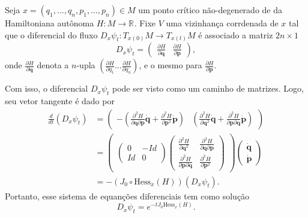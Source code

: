 \documentclass[12pt]{book}
\newcommand{\derivada}[2]{\frac{d #1}{d #2}}
\newcommand{\derivadaparcial}[2]{\frac{\partial #1}{\partial #2}}
\newcommand{\derivadaparcialdois}[2]{\frac{\partial^{2} #1}{\partial #2^{2}}}
\newcommand{\derivadaparcialdoisdois}[3]{\frac{\partial^{2} #1}{\partial #2 \partial#3}}
\newcommand{\espacotangenteponto}[2]{T_{#1}#2}
\newcommand{\estruturacomplexa}{J_{0}}
\newcommand{\hessianaponto}[2]{\text{Hess}_{#1}(#2)}
\newcommand{\real}[1]{\mathbb{R}^{#1}}
\newcommand{\reta}{\real{}}
\begin{document}
	Seja $x=(q_{1}, \dots, q_{n},p_{1}, \dots, p_{n})\in M$ um ponto crítico não-degenerado de da Hamiltoniana autônoma $H:M \to \reta$. Fixe $V$ uma vizinhança corrdenada de $x$ tal que o diferencial do fluxo $D_{x}\psi_{t}:\espacotangenteponto{x(0)}{M} \to \espacotangenteponto{x(t)}{M}$ é associado a matriz $2n\times 1$
	$$
	D_{x}\psi_{t} = 
	\left(
		\begin{array}{cc}
		\derivadaparcial{H}{\textbf{q}} &\derivadaparcial{H}{\textbf{p}}
		\end{array}
	\right),
	$$
	onde $\derivadaparcial{H}{\textbf{q}}$ denota a $n$-upla $(	\derivadaparcial{H}{q_{1}} \dots \derivadaparcial{H}{q_{n}})$, e o mesmo para $\derivadaparcial{H}{\textbf{p}}$.
	
	Com isso, o diferencial $D_{x}\psi_{t}$ pode ser visto como um caminho de matrizes. Logo, seu vetor tangente é dado por
	$$
	\begin{aligned}
		\derivada{}{t}(D_{x}\psi_{t})
		&=
		\left(
		\begin{array}{cc}
		-(\derivadaparcialdoisdois{H}{\textbf{q}}{\textbf{p}}\dot{\textbf{q}}+\derivadaparcialdois{H}{\textbf{p}}\dot{\textbf{p}}) & 
		(\derivadaparcialdois{H}{\textbf{q}}\dot{\textbf{q}}+\derivadaparcialdoisdois{H}{\textbf{p}}{\textbf{q}}\dot{\textbf{p}})
		\end{array}
		\right)
		\\
		&=
		\left(
			\begin{array}{c}
			\left(
			\begin{array}{cc}
			0& -Id
			\\
			Id & 0
			\end{array}
			\right)
			\left(
			\begin{array}{cc}
			\derivadaparcialdois{H}{\textbf{q}} & 
			\derivadaparcialdoisdois{H}{\textbf{q}}{\textbf{p}}
			\\
			\derivadaparcialdoisdois{H}{\textbf{p}}{\textbf{q}} & \derivadaparcialdois{H}{\textbf{p}}
			\end{array}
			\right)
			\end{array}
		\right)
		\left(
		\begin{array}{c}
		\dot{\textbf{q}}
		\\
		\dot{\textbf{p}}
		\end{array}
		\right)
		\\
		&= -(\estruturacomplexa\circ \hessianaponto{x}{H})(	D_{x}\psi_{t}).
	\end{aligned}
	$$
	Portanto, esse sistema de equanções diferenciais tem como solução
	$$
		D_{x}\psi_{t} = e^{-t\estruturacomplexa \hessianaponto{x}{H}}.
	$$
	
\end{document}
